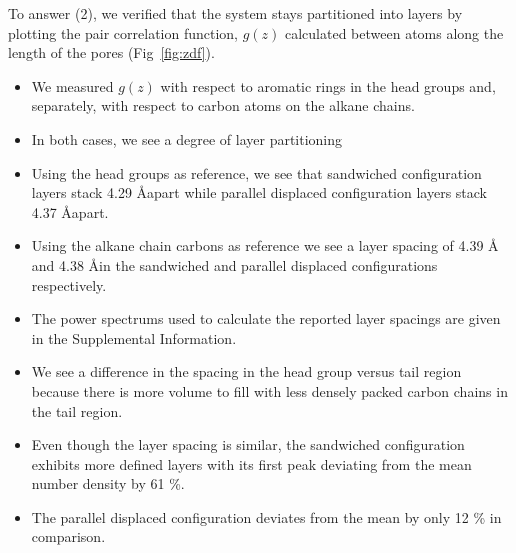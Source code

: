 \documentclass{article}
\newcommand{\angstrom}{\textup{\AA}}
\begin{document}
  To answer (2), we verified that the system stays partitioned into layers by
  plotting the pair correlation function, $g(z)$ calculated between atoms along
  the length of the pores (Fig~\ref{fig:zdf}).
  \begin{itemize}
	\item We measured $g(z)$ with respect to aromatic rings in the head groups
	and, separately, with respect to carbon atoms on the alkane chains.
	\item In both cases, we see a degree of layer partitioning
        \item Using the head groups as reference, we see that sandwiched configuration
	layers stack 4.29 \angstrom apart while parallel displaced configuration layers
	stack 4.37 \angstrom apart.
	\item Using the alkane chain carbons as reference we see a layer spacing of 4.39 \angstrom
	and 4.38 \angstrom in the sandwiched and parallel displaced configurations respectively.
        \item The power spectrums used to calculate the reported layer spacings are given in the 
        Supplemental Information.  %
	\item We see a difference in the spacing in the head group versus tail region
	because there is more volume to fill with less densely packed carbon chains in the tail region. 
	\item Even though the layer spacing is similar, the sandwiched configuration
	exhibits more defined layers with its first peak deviating from the mean 
        number density by 61 \%. %
	\item The parallel displaced configuration deviates from the mean by only 
	12 \% in comparison.
  \end{itemize}
\end{document}
